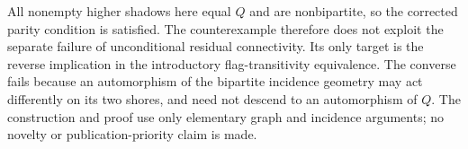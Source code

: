 \documentclass[11pt,a4paper]{article}
\begin{document}
All nonempty higher shadows here equal $Q$ and are nonbipartite,
so the corrected parity condition is satisfied. The counterexample
therefore does not exploit the separate failure of unconditional
residual connectivity. Its only target is the reverse implication
in the introductory flag-transitivity equivalence. The converse
fails because an automorphism of the bipartite incidence geometry
may act differently on its two shores, and need not descend to an
automorphism of $Q$. The construction and proof use only elementary
graph and incidence arguments; no novelty or publication-priority
claim is made.
\end{document}

